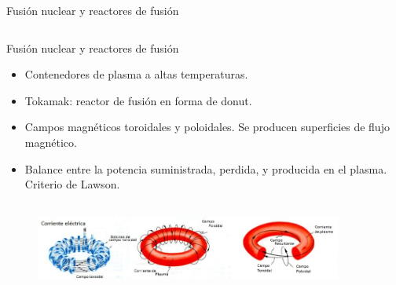 \documentclass[11pt]{beamer}
\begin{document}
\begin{frame}{Fusión nuclear y reactores de fusión}
\begin{columns}
        \end{columns}
        \end{frame}

        \begin{frame}[t]{Fusión nuclear y reactores de fusión}
        \fontsize{9pt}{11}\selectfont
       
        \begin{block}{}
        \begin{itemize}
            \item Contenedores de plasma a altas temperaturas.
            \item Tokamak: reactor de fusión en forma de donut.
            \item Campos magnéticos toroidales y poloidales. Se producen superficies de flujo magnético.
            \item Balance entre la potencia suministrada, perdida, y producida en el plasma. Criterio de Lawson.     
        \end{itemize}
        \end{block}
        
        \begin{figure}
        \centering
         \includegraphics[width=0.9\textwidth,height=3cm]{campos_magn.jpg}
        \label{fig:fusion}
        \end{figure}
       

        \end{frame}
\end{document}
